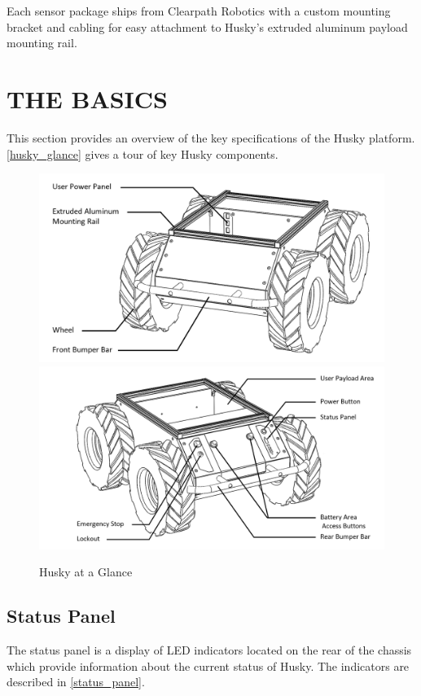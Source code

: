 \documentclass[]{clearpath-latex/clearpath-manual}
\begin{document}
Each sensor package ships from Clearpath Robotics with a custom mounting bracket and cabling for easy attachment to Husky’s extruded aluminum payload mounting rail.


\section{THE BASICS}

This section provides an overview of the key specifications of the Husky platform. \autoref{husky_glance} gives a tour of key Husky components.


\begin{figure}[h]
  \centering
  \includegraphics[width=0.75\linewidth]{husky-front.PNG}
  \includegraphics[width=0.75\linewidth]{husky-rear.PNG}
  \caption{Husky at a Glance}
  \label{husky_glance}
\end{figure}
\newpage

\subsection{Status Panel}

The status panel is a display of LED indicators located on the rear of the chassis which 
provide information about the current status of Husky. The indicators are described in \autoref{status_panel}.
\end{document}
